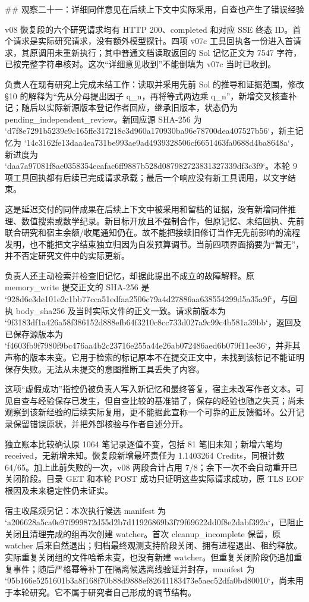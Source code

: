 ## 观察二十一：详细同伴意见在后续上下文中实际采用，自查也产生了错误经验

v08 恢复段的六个研究请求均有 HTTP 200、completed 和对应 SSE 终态 ID。首个请求是实际研究请求，没有额外模型探针。四项 v07c 工具回执各一份进入首请求，其原调用未重新执行；其中普通文档读取返回的 Sol 记忆正文为 7547 字符，已按完整字符串核对。这次“详细意见收到”不能倒填为 v07c 当时已收到。

负责人在现有研究上完成未结工作：读取并采用先前 Sol 的推导和证据范围，修改 §10 的解释为“先从分母提出因子 q_n，再将等式两边乘 q_n”，新增交叉核查补记；随后以实际新源版本登记作者回应，继承旧版本，状态仍为 pending_independent_review。新回应源 SHA-256 为 `d7f8e7291b5239c9c165ffe317218c3d960a170930ba96e78700dea407527b56`，新主记忆为 `14c3162fe13daa4ea731be993ae9ad4939328506cf6651463fa0688d4ba8648a`，新进度为 `daa7a97081f8ae0358354ecafac6ff9887b528d087982723831327339df3c3f9`。本轮 9 项工具回执都有后续已完成请求承载；最后一个响应没有新工具调用，以文字结束。

这是延迟交付的同伴成果在后续上下文中被采用和留档的证据，没有新增同伴推理、数值搜索或数学纪录。新目标开放且不强制合作，但原记忆、未结回执、先前联合研究和宿主余额/收尾通知仍在。故不能把接续旧修订当作无先前影响的流程发明，也不能把文字结束独立归因为自发预算调节。当前四项界面摘要为“暂无”，并不否定研究文件中的实际更新。

负责人还主动检索并检查旧记忆，却据此提出不成立的故障解释。原 memory_write 提交正文的 SHA-256 是 `928d6e3de101e2c1bb77cca51edfaa2506c79a4d27886aa638554299d5a35a9f`，与回执 body_sha256 及当时实际文件的正文一致。请求前版本为 `9f3183df1a426a58f386152d888efb64f3210c8cc733d027a9c99c4b581a39bb`，返回及已保存源版本为 `f4603fb9f7980f9bc476aa4b2c23716e255a44e26ab072486aed6b079f11ee36`，并非其声称的版本未变。它用于检索的标记原本不在提交正文中，未找到该标记不能证明保存失败。无法从未提交的意图推断工具丢失了内容。

这项“虚假成功”指控仍被负责人写入新记忆和最终答复，宿主未改写作者文本。可见自查与经验保存已发生，但自查比较的基准错了，保存的经验也随之失真；尚未观察到该新经验的后续实际复用，更不能据此宣称一个可靠的正反馈循环。公开记录保留错误原状，并把外部核验与作者自述分开。

独立账本比较确认原 1064 笔记录逐值不变，包括 81 笔旧未知；新增六笔均 received，无新增未知。恢复段新增最坏责任为 1.1403264 Credits，同根计数 64/65。加上此前失败的一次，v08 两段合计占用 7/8；余下一次不会自动重开已关闭阶段。目录 GET 和本轮 POST 成功只证明这些实际请求成功，原 TLS EOF 根因及未来稳定性仍未证实。

宿主收尾须另记：本次执行候选 manifest 为 `a206628a5ca0e97f999872d55d2b7d11926869b3f79f69622dd0f8e2dabf392a`，已阻止关闭且清理完成的组再次创建 watcher。首次 cleanup_incomplete 保留，原 watcher 后来自然退出；归档最终观测支持阶段关闭、拥有进程退出、租约释放。实际重复关闭组的文件哈希未变，也没有新建 watcher。但重复关闭阶段仍追加重复事件；随后严格幂等补丁在隔离候选离线验证并封存，manifest 为 `95b166e5251601b3a8f168f70b88d9888ef82641183473e5aec52dfa0bd80010`，尚未用于本轮研究。它不属于研究者自己形成的调节结构。

